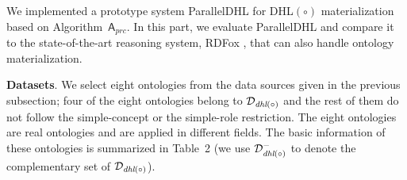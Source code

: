 \documentclass[final,1p,times]{elsarticle}
\begin{document}
We implemented a prototype system ParallelDHL for DHL$(\circ)$ materialization
based on Algorithm~$\mathsf{A}_{prc}$. In this part, we evaluate ParallelDHL and
compare it to the state-of-the-art reasoning system, RDFox \cite{MotikNPHO14},
that can also handle ontology materialization.

\textbf{Datasets}.
We select eight ontologies from the data sources given in the previous subsection;
four of the eight ontologies belong to $\mathcal{D}_{\textit{\text{dhl}}(\circ)}$ and
the rest of them do not follow the simple-concept or the simple-role
restriction.
The eight ontologies are real ontologies and are applied in different fields.
The basic information of these ontologies
is summarized in Table~2 (we use $\mathcal{D}^-_{\textit{\text{dhl}}(\circ)}$
to denote the complementary set of $\mathcal{D}_{\textit{\text{dhl}}(\circ)}$).
\end{document}
